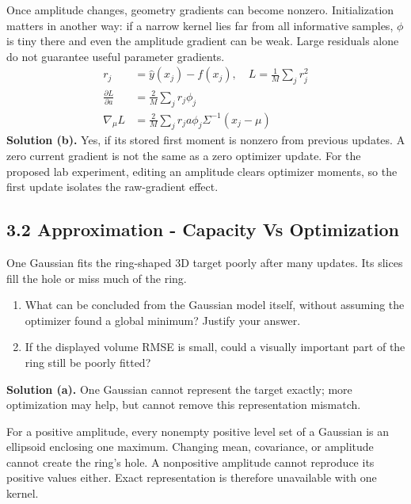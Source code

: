 \documentclass[11pt,a4paper]{article}
\begin{document}
Once amplitude changes, geometry gradients can become nonzero.
Initialization matters in another way: if a narrow kernel lies far from all informative samples, $\phi$ is tiny there and even the amplitude gradient can be weak.
Large residuals alone do not guarantee useful parameter gradients.
\[
\begin{aligned}r_j&=\hat y(x_j)-f(x_j),\quad L=\frac1M\sum_jr_j^2\\\frac{\partial L}{\partial a}&=\frac2M\sum_jr_j\phi_j\\\nabla_\mu L&=\frac2M\sum_jr_j a\phi_j\Sigma^{-1}(x_j-\mu)\end{aligned}
\]
\noindent\textbf{Solution (b).} Yes, if its stored first moment is nonzero from previous updates.
A zero current gradient is not the same as a zero optimizer update.
For the proposed lab experiment, editing an amplitude clears optimizer moments, so the first update isolates the raw-gradient effect.
\subsection*{3.2 Approximation - Capacity Vs Optimization}
One Gaussian fits the ring-shaped 3D target poorly after many updates.
Its slices fill the hole or miss much of the ring.
\begin{enumerate}[label=(\alph*),nosep]
\item What can be concluded from the Gaussian model itself, without assuming the optimizer found a global minimum?
Justify your answer.
\item If the displayed volume RMSE is small, could a visually important part of the ring still be poorly fitted?
\end{enumerate}
\noindent\textbf{Solution (a).} One Gaussian cannot represent the target exactly; more optimization may help, but cannot remove this representation mismatch.

For a positive amplitude, every nonempty positive level set of a Gaussian is an ellipsoid enclosing one maximum.
Changing mean, covariance, or amplitude cannot create the ring’s hole.
A nonpositive amplitude cannot reproduce its positive values either.
Exact representation is therefore unavailable with one kernel.
\end{document}

